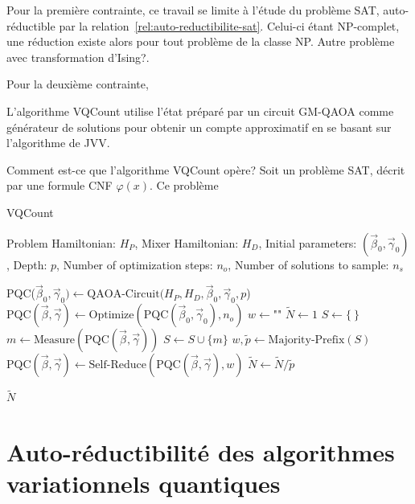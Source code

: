 Pour la première contrainte, ce travail se limite à l'étude du problème SAT, auto-réductible par la relation~\ref{rel:auto-reductibilite-sat}. Celui-ci étant \textsf{NP}-complet, une réduction existe alors pour tout problème de la classe \textsf{NP}. \textsf{Autre problème avec transformation d'Ising?}. 

Pour la deuxième contrainte, 





L'algorithme VQCount utilise l'état préparé par un circuit GM-QAOA comme générateur de solutions pour obtenir un compte approximatif en se basant sur l'algorithme de JVV. 

Comment est-ce que l'algorithme VQCount opère? Soit un problème SAT, décrit par une formule CNF $\varphi(x)$. Ce problème   



\begin{algorithm}[hb!]
    \caption{VQCount}\label{alg:vqcount}
    \begin{algorithmic}[1]
    \REQUIRE Problem Hamiltonian: $H_P$, Mixer Hamiltonian: $H_D$, Initial parameters: $(\vec{\beta}_0, \vec{\gamma}_0)$, Depth: $p$, Number of optimization steps: $n_{o}$, Number of solutions to sample: $n_s$
    
    \STATE PQC($\vec{\beta}_0, \vec{\gamma}_0) \leftarrow \text{QAOA-Circuit}(H_P, H_D, \vec{\beta}_0, \vec{\gamma}_0, p$)
    \STATE $\text{PQC}(\vec{\beta}, \vec{\gamma}) \leftarrow \text{Optimize}(\text{PQC}(\vec{\beta}_0, \vec{\gamma}_0), n_{o})$
    \STATE $w \leftarrow \texttt{""}$ 
    \STATE $\tilde{N} \leftarrow 1$
    \STATE $S \leftarrow \{ \ \}$
    \STATE $m \leftarrow \text{Measure}(\text{PQC}(\vec{\beta}, \vec{\gamma}))$
    \STATE $S \leftarrow S \cup \{m\}$
    \ENDIF
    \ENDWHILE
    \STATE $w, \tilde{p} \leftarrow \text{Majority-Prefix}(S)$
    \STATE $\text{PQC}(\vec{\beta}, \vec{\gamma}) \leftarrow \text{Self-Reduce}(\text{PQC}(\vec{\beta}, \vec{\gamma}), w)$
    \STATE $\tilde{N} \leftarrow \tilde{N} / \tilde{p}$
    \ENDFOR
    
    \RETURN $\tilde{N}$
\end{algorithmic}
\end{algorithm}
    



\section{Auto-réductibilité des algorithmes variationnels quantiques}

